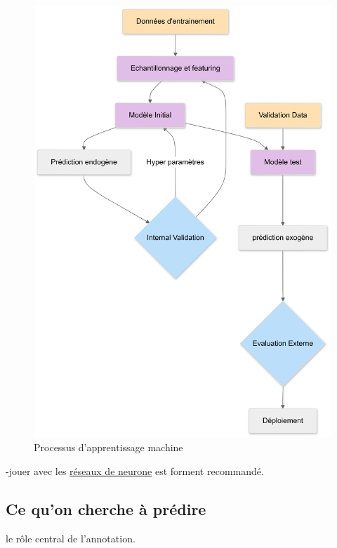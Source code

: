 \documentclass[
  letterpaper,
  DIV=11,
  numbers=noendperiod]{scrreprt}
\begin{document}
\begin{figure}[H]

{\centering \includegraphics{image/ML2024.png}

}

\caption{Processus d'apprentissage machine}

\end{figure}%

-jouer avec les \href{https://playground.tensorflow.org/}{réseaux de
neurone} est forment recommandé.

\subsection{Ce qu'on cherche à
prédire}\label{ce-quon-cherche-uxe0-pruxe9dire}

le rôle central de l'annotation.
\end{document}
